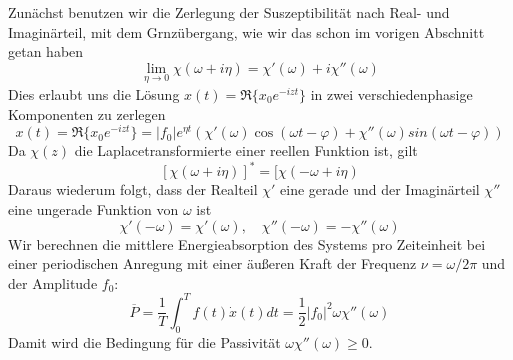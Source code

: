 Zunächst benutzen wir die Zerlegung der Suszeptibilität nach Real- und
Imaginärteil, mit dem Grnzübergang, wie wir das schon im vorigen Abschnitt
getan haben
\[ 
\lim_{\eta\rightarrow 0}\chi(\omega+i\eta)=\chi'(\omega)+i\chi''(\omega)
\]
Dies erlaubt uns die Lösung $x(t)=\Re\{x_0e^{-izt}\}$ in zwei
verschiedenphasige Komponenten zu zerlegen
\begin{equation}
  x(t)=\Re\{x_0e^{-izt}\}=
  |f_0|e^{\eta t}\left(\chi'(\omega)\cos(\omega t-\varphi)
  +\chi''(\omega)sin(\omega t-\varphi)\right)
  \label{eq:Zweiphasig}
\end{equation}
Da $\chi(z)$ die Laplacetransformierte einer reellen Funktion ist, gilt
\[ [\chi(\omega+i\eta)]^*=[\chi(-\omega+i\eta)\]
Daraus wiederum folgt, dass der Realteil $\chi'$ eine gerade und der
Imaginärteil $\chi''$ eine ungerade Funktion von $\omega$ ist
\[ \chi'(-\omega)=\chi'(\omega),\quad \chi''(-\omega)=-\chi''(\omega) \]
Wir berechnen die mittlere Energieabsorption des Systems pro Zeiteinheit bei
einer periodischen Anregung mit einer äußeren Kraft der Frequenz
$\nu=\omega/2\pi$ und der Amplitude $f_0$:
\[
  \overline{P}=\frac{1}{T}\int_0^T f(t)\dot{x}(t)dt=
  \frac{1}{2}|f_0|^2\omega\chi''(\omega)
\]
Damit wird die Bedingung für die Passivität $\omega\chi''(\omega)\ge 0$.
%
%

